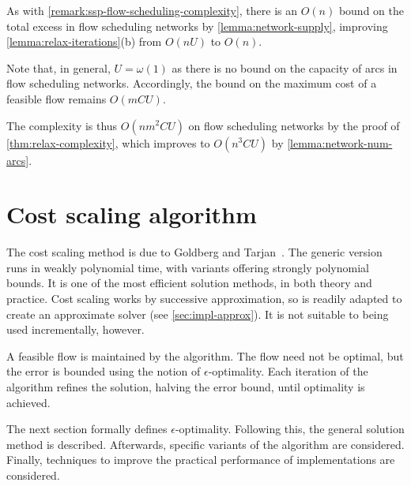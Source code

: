 \begin{remark}
As with \cref{remark:ssp-flow-scheduling-complexity}, there is an $O(n)$ bound on the total excess in flow scheduling networks by \cref{lemma:network-supply}, improving \cref{lemma:relax-iterations}(b) from $O\left(nU\right)$ to $O(n)$. 

Note that, in general, $U = \omega(1)$ as there is no bound on the capacity of arcs in flow scheduling networks. Accordingly, the bound on the maximum cost of a feasible flow remains $O(mCU)$.

The complexity is thus $O\left(nm^2CU\right)$ on flow scheduling networks by the proof of \cref{thm:relax-complexity}, which improves to $O\left(n^3CU\right)$ by \cref{lemma:network-num-arcs}.
\end{remark}

\section{Cost scaling algorithm} \label{sec:impl-cost-scaling}


The cost scaling method is due to Goldberg and Tarjan~\cite{Goldberg:1987}. The generic version runs in weakly polynomial time, with variants offering strongly polynomial bounds. It is one of the most efficient solution methods, in both theory and practice\footnotemark. Cost scaling works by successive approximation, so is readily adapted to create an approximate solver (see \cref{sec:impl-approx}). It is not suitable to being used incrementally, however.

A feasible flow is maintained by the algorithm. The flow need not be optimal, but the error is bounded using the notion of $\epsilon$-optimality. Each iteration of the algorithm refines the solution, halving the error bound, until optimality is achieved.

The next section formally defines $\epsilon$-optimality. Following this, the general solution method is described. Afterwards, specific variants of the algorithm are considered. Finally, techniques to improve the practical performance of implementations are considered.

